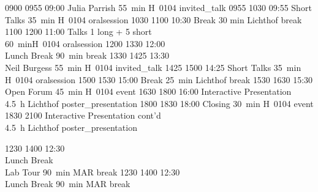 \begin{timetable}
   {0900} {0955} {09:00 Julia Parrish}                        {55~min}                           {H~0104}                  {invited_talk}
   {0955} {1030} {09:55 Short Talks}                          {\vspace{1.5mm}35~min}             {\vspace{1.5mm}H~0104}        {oralsession}
   {1030} {1100} {10:30 Break}                                {\vspace{1.5mm}30 min}             {\vspace{1.5mm}Lichthof}  {break}
   {1100} {1200} {11:00 Talks}                        {\vspace{-0.5em}1 long + 5 short\\60~min}{H~0104}             {oralsession}
   {1200} {1330} {12:00\\[0.2em]Lunch Break}                  {90~min}                           {}                        {break}
   {1330} {1425} {13:30\\Neil Burgess}                        {55~min}                           {H~0104}                   {invited_talk}
   {1425} {1500} {14:25 Short Talks} 		                  {\vspace{1.5mm}35~min}             {\vspace{1.5mm}H~0104}        {oralsession}
   {1500} {1530} {\vspace{-1.5mm}15:00 Break}                 {\vspace{1.5mm}25~min}             {\vspace{1.5mm}Lichthof}  {break}
   {1530} {1630} {15:30 Open Forum}                           {\vspace{1.5mm}45~min}             {\vspace{1.5mm}H~0104}    {event}
   {1630} {1800} {16:00 Interactive Presentation}             {4.5~h }                           {Lichthof}                  {poster_presentation}
   {1800} {1830} {18:00 Closing}                              {\vspace{1.5mm}30~min}             {\vspace{1.5mm}H~0104}    {event}
   {1830} {2100} {Interactive Presentation cont'd\\\vspace{1em}{\footnotesize Interactive Food at 18:30}}      {4.5~h}                            {\vspace{1.5mm}Lichthof}    {poster_presentation}


   {1230} {1400} {12:30\\\vspace{0.2em}Lunch Break\\[0.5em]\small Lab Tour}         {90~min}                {MAR}                   {break}
   {1230} {1400} {12:30\\\vspace{0.2em}Lunch Break}         {90~min}                {MAR}                   {break}

\end{timetable}
